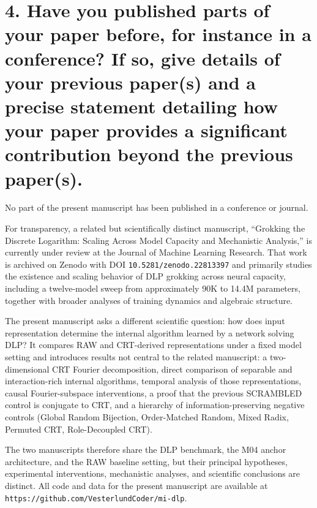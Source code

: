 \documentclass[9pt,a4paper]{extarticle}
\begin{document}
\section*{4. Have you published parts of your paper before, for instance in a conference? If so, give details of your previous paper(s) and a precise statement detailing how your paper provides a significant contribution beyond the previous paper(s).}

No part of the present manuscript has been published in a conference or journal.

For transparency, a related but scientifically distinct manuscript, ``Grokking the Discrete Logarithm: Scaling Across Model Capacity and Mechanistic Analysis,'' is currently under review at the Journal of Machine Learning Research. That work is archived on Zenodo with DOI \texttt{10.5281/zenodo.22813397} and primarily studies the existence and scaling behavior of DLP grokking across neural capacity, including a twelve-model sweep from approximately 90K to 14.4M parameters, together with broader analyses of training dynamics and algebraic structure.

The present manuscript asks a different scientific question: how does input representation determine the internal algorithm learned by a network solving DLP? It compares RAW and CRT-derived representations under a fixed model setting and introduces results not central to the related manuscript: a two-dimensional CRT Fourier decomposition, direct comparison of separable and interaction-rich internal algorithms, temporal analysis of those representations, causal Fourier-subspace interventions, a proof that the previous SCRAMBLED control is conjugate to CRT, and a hierarchy of information-preserving negative controls (Global Random Bijection, Order-Matched Random, Mixed Radix, Permuted CRT, Role-Decoupled CRT).

The two manuscripts therefore share the DLP benchmark, the M04 anchor architecture, and the RAW baseline setting, but their principal hypotheses, experimental interventions, mechanistic analyses, and scientific conclusions are distinct. All code and data for the present manuscript are available at \texttt{https://github.com/VesterlundCoder/mi-dlp}.
\end{document}
